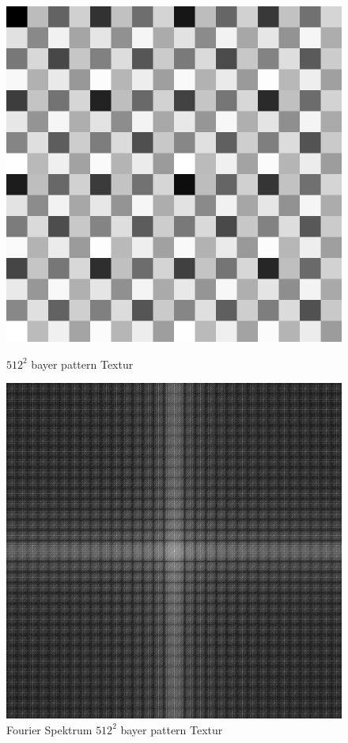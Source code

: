 \begin{figure}[H]\label{pic:blueNoiseFFT}
    \centering
    \begin{minipage}[t]{0.45\linewidth}
        \centering
        \includegraphics[width=.75\linewidth]{content/BlueNoise/Bilder/BayerMatrix.png}
        \caption{$512^{2}$ bayer pattern Textur}
    \end{minipage}
    \hfill
    \begin{minipage}[t]{0.45\linewidth}
        \centering
        \includegraphics[width=\linewidth]{content/BlueNoise/Bilder/FFT_BayerMatrix.png}
        \caption{Fourier Spektrum $512^{2}$ bayer pattern Textur}
    \end{minipage}
\end{figure}

